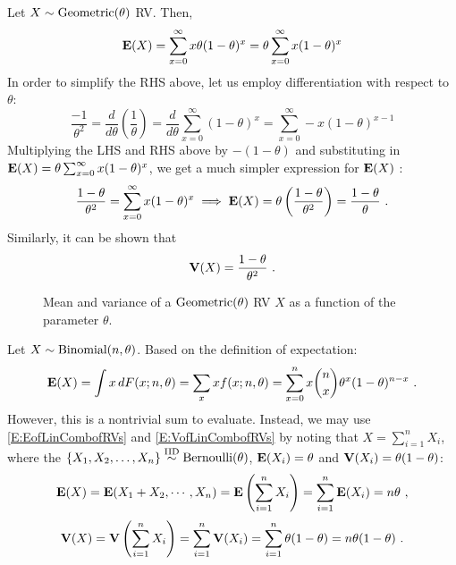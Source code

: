 \begin{example}\label{EgmeanAndVarOfGeometric}
Let $X \sim \mbox{{\rm Geometric}}(\theta)$ RV.  Then,
\[
\mathbf{E}(X) = \sum_{x=0}^{\infty} x \theta(1-\theta)^x =  \theta \sum_{x=0}^{\infty} x (1-\theta)^x
\]
In order to simplify the RHS above, let us employ differentiation with respect to $\theta$:
\[
\frac{-1}{\theta^2}= \frac{d}{d\theta} \left( \frac{1}{\theta} \right)= \frac{d}{d\theta} \sum_{x=0}^{\infty} (1-\theta)^x  =  \sum_{x=0}^{\infty} -x (1-\theta)^{x-1}
\]
Multiplying the LHS and RHS above by $-(1-\theta)$ and substituting in $\mathbf{E}(X)=  \theta \sum_{x=0}^{\infty} x (1-\theta)^x$, we get a much simpler expression for $\mathbf{E}(X)$ :
\[
\frac{1-\theta}{\theta^2}= \sum_{x=0}^{\infty} x (1-\theta)^{x} \implies \mathbf{E}(X) = \theta \left( \frac{1-\theta}{\theta^2} \right) = \frac{1-\theta}{\theta} \ .
\]
Similarly, it can be shown that
\[
\mathbf{V}(X) = \frac{1-\theta}{\theta^2} \ .
\]

\begin{figure}[htpb]
\caption{Mean and variance of a $\mbox{{\rm Geometric}}(\theta)$ RV $X$ as a function of the parameter $\theta$.\label{F:MeanVarGeom}}
\centering   {}
\end{figure}
\end{example}

\begin{example}\label{EgMeanAndVarOfBinomial}
Let $X \sim \mbox{{\rm Binomial}}(n,\theta)$.  Based on the definition of expectation:
\[
\mathbf{E}(X) = \int x \, dF(x; n,\theta) = \sum_x x f(x;n,\theta) = \sum_{x =0}^n x \binom{n}{x} \theta^x (1-\theta)^{n-x} \ .
\]
However, this is a nontrivial sum to evaluate.  Instead, we may use \eqref{E:EofLinCombofRVs} and \eqref{E:VofLinCombofRVs} by noting that $X = \sum_{i=1}^n X_i$, where the $\{X_1,X_2,\ldots,X_n \} \overset{{\rm IID}}{\sim} \mbox{{\rm Bernoulli}}(\theta)$, $\mathbf{E}(X_i) = \theta$ and $\mathbf{V}(X_i)=\theta(1-\theta)$:
\[
\mathbf{E}(X) = \mathbf{E}(X_1+X_2, \cdots ,X_n) = \mathbf{E} \left( \sum_{i=1}^n X_i \right) = \sum_{i=1}^n \mathbf{E}(X_i) = n \theta \ ,
\]
\[
\mathbf{V}(X) = \mathbf{V} \left( \sum_{i=1}^n X_i \right) = \sum_{i=1}^n \mathbf{V}(X_i) = \sum_{i=1}^n{\theta(1-\theta)} = n\theta(1-\theta) \ .
\]
\end{example}

